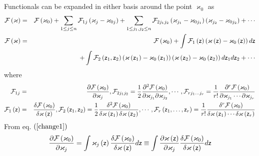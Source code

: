 Functionals can be expanded in either basis around the point $\varkappa _{0}$
as 
\begin{eqnarray}
{\cal F}\left( \varkappa \right) &=&{\cal F}\left( \varkappa _{0}\right)
+\sum_{1\leq j\leq n}{\cal F}_{1j}\left( \varkappa _{j}-\varkappa
_{0j}\right) +\sum_{1\leq j_{1},j_{2}\leq n}{\cal F}_{2j_{1}j_{2}}\left(
\varkappa _{j_{1}}-\varkappa _{0j_{1}}\right) \left( \varkappa
_{j_{2}}-\varkappa _{0j_{2}}\right) +\cdots  \nonumber \\
{\cal F}\left( \varkappa \right) &=&{\cal F}\left( \varkappa _{0}\right)
+\int {\cal F}_{1}\left( {\sf z}\right) \left( \varkappa \left( {\sf z}%
\right) -\varkappa _{0}\left( {\sf z}\right) \right) d{\sf z}  \nonumber \\
&&\qquad \quad +\int {\cal F}_{2}\left( {\sf z}_{1},{\sf z}_{2}\right)
\left( \varkappa \left( {\sf z}_{1}\right) -\varkappa _{0}\left( {\sf z}%
_{1}\right) \right) \left( \varkappa \left( {\sf z}_{2}\right) -\varkappa
_{0}\left( {\sf z}_{2}\right) \right) d{\sf z}_{1}d{\sf z}_{2}+\cdots
\end{eqnarray}%
where 
\begin{eqnarray}
{\cal F}_{1j} &=&\frac{\partial {\cal F}\left( \varkappa _{0}\right) }{%
\partial \varkappa _{j}},{\cal F}_{2j_{1}j_{2}}=\frac{1}{2}\frac{\partial
^{2}{\cal F}\left( \varkappa _{0}\right) }{\partial \varkappa
_{j_{1}}\partial \varkappa _{j_{2}}},\cdots ,{\cal F}_{rj_{1}\ldots j_{r}}=%
\frac{1}{r!}\frac{\partial ^{r}{\cal F}\left( \varkappa _{0}\right) }{%
\partial \varkappa _{j_{1}}\cdots \partial \varkappa _{j_{r}}}  \nonumber \\
{\cal F}_{1}\left( {\sf z}\right) &=&\frac{\delta {\cal F}\left( \varkappa
_{0}\right) }{\delta \varkappa \left( {\sf z}\right) },{\cal F}_{2}\left( 
{\sf z}_{1},{\sf z}_{2}\right) =\frac{1}{2}\frac{\delta ^{2}{\cal F}\left(
\varkappa _{0}\right) }{\delta \varkappa \left( {\sf z}_{1}\right) \delta
\varkappa \left( {\sf z}_{2}\right) },\cdots ,{\cal F}_{r}\left( {\sf z}%
_{1},\ldots ,{\sf z}_{r}\right) =\frac{1}{r!}\frac{\delta ^{r}{\cal F}\left(
\varkappa _{0}\right) }{\delta \varkappa \left( {\sf z}_{1}\right) \cdots
\delta \varkappa \left( {\sf z}_{r}\right) }
\end{eqnarray}%
From eq. $\left( \ref{change1}\right) $%
\begin{equation}
\frac{\partial {\cal F}\left( \varkappa _{0}\right) }{\partial \varkappa _{j}%
}=\int \varkappa _{j}\left( {\sf z}\right) \frac{\delta {\cal F}\left(
\varkappa _{0}\right) }{\delta \varkappa \left( {\sf z}\right) }d{\sf z}%
\equiv \int \frac{\partial \varkappa \left( {\sf z}\right) }{\partial
\varkappa _{j}}\frac{\delta {\cal F}\left( \varkappa _{0}\right) }{\delta
\varkappa \left( {\sf z}\right) }d{\sf z}
\end{equation}%
